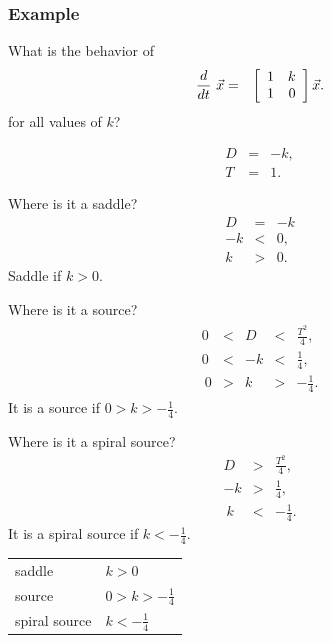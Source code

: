 \begin{frame}
  \frametitle{Example}

  What is the behavior of
  \begin{eqnarray*}
    \deriv{~}{t} \vec{x} & = & \arrayTwo{1}{k}{1}{0} \vec{x}.
  \end{eqnarray*}
  for all values of $k$?

  {
    \begin{eqnarray*}
      D & = & -k, \\
      T & = & 1.
    \end{eqnarray*}
  }



  {
    Where is it a saddle?
    \begin{eqnarray*}
      D & = & -k \\
      -k & < & 0, \\ 
      k & > & 0.
    \end{eqnarray*}
    Saddle if $k>0$.
  }

  {
    Where is it a source?
    \begin{eqnarray*}
      \begin{array}{rcccl}
        0 & < & D & < & \frac{T^2}{4}, \\
        0 & < & -k & < & \frac{1}{4}, \\\
        0 & > &  k & > & -\frac{1}{4}.
      \end{array}
    \end{eqnarray*}
    It is a source if $0 > k  > -\frac{1}{4}$.
  }

  {
    Where is it a spiral source?
    \begin{eqnarray*}
        D  & > & \frac{T^2}{4}, \\
        -k & > & \frac{1}{4}, \\\
        k  & < & -\frac{1}{4}.
    \end{eqnarray*}
    It is a spiral source if $k < -\frac{1}{4}$.
  }

  {
    \begin{tabular}{ll}
      saddle        & $k>0$\\
      source        & $0 > k  > -\frac{1}{4}$ \\
      spiral source & $k < -\frac{1}{4}$
    \end{tabular}
  }
  

\end{frame}


